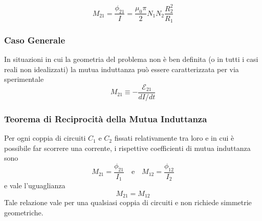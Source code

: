 \begin{equation*}
	M_{21} = \frac{\phi_{21}}{I} = \frac{\mu_0 \pi}{2}N_1N_2\frac{R_2^2}{R_1}
\end{equation*}

\subsubsection{Caso Generale}

In situazioni in cui la geometria del problema non \`e ben definita (o in tutti i casi reali non idealizzati) la mutua induttanza pu\`o essere caratterizzata per via sperimentale 
\begin{equation}
	M_{21} \equiv  - \frac{\mathcal{E}_{21}}{dI/dt}
\end{equation}

\subsubsection{Teorema di Reciprocit\`a della Mutua Induttanza}


Per ogni coppia di circuiti $C_1$ e $C_2$ fissati relativamente tra loro e in cui \`e possibile far scorrere una corrente, i rispettive coefficienti di mutua induttanza sono
\begin{equation*}
	M_{21} = \frac{\phi_{21}}{I_1} \quad \text{e} \quad M_{12} = \frac{\phi_{12}}{I_2}
\end{equation*}
e vale l'uguaglianza 
\begin{equation}
	M_{21} = M_{12}
\end{equation}
Tale relazione vale per una qualsiasi coppia di circuiti e non richiede simmetrie geometriche.

